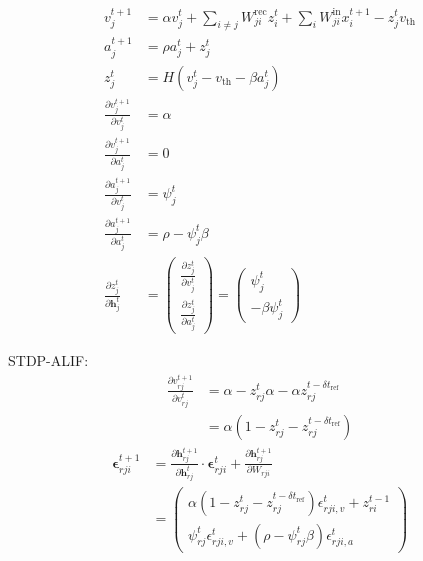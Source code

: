 \documentclass[t]{beamer}
\begin{document}
\begin{frame}
\begin{align}
v^{t+1}_j &= \alpha v_j^t + \sum_{i\neq j}W^\text{rec}_{ji}z_i^t + \sum_i W^\text{in}_{ji}x_i^{t+1} - z_j^tv_
            \text{th}\\
a^{t+1}_j &= \rho a^t_j + z^t_j\\
z^t_j &= H\left(v_j^t - v_\text{th} - \beta a^t_j\right)\\
\frac{\partial v_j^{t+1}}{\partial v_j^t} &= \alpha\\
\frac{\partial v_j^{t+1}}{\partial a_j^t} &= 0\\
\frac{\partial a_j^{t+1}}{\partial v_j^t} &= \psi^t_j\\
\frac{\partial a_j^{t+1}}{\partial a_j^t} &= \rho - \psi^t_j\beta\\
\frac{\partial z^t_j}{\partial\mathbf{h}^t_j} &= \begin{pmatrix}
                    \frac{\partial z^t_j}{\partial v^t_j}\\
                    \frac{\partial z^t_j}{\partial a^t_j}
                    \end{pmatrix}
                = \begin{pmatrix}
                    \psi^t_j\\
                    -\beta\psi^t_j
                    \end{pmatrix}
\end{align}
\end{frame}

\begin{frame}
STDP-ALIF:
\begin{align}
          \frac{\partial v_{rj}^{t+1}}{\partial v^t_{rj}} &= \alpha - z^t_{rj}\alpha - \alpha z_{rj}^{t-\delta t_\text{ref}}\\
          &= \alpha\left(1 - z^t_{rj} - z_{rj}^{t-\delta t_\text{ref}}\right)
          \end{align}
\begin{align}
          \bm{\epsilon}^{t+1}_{rji} &= \frac{\partial\mathbf{h}^{t+1}_{rj}}{\partial\mathbf{h}^t_{rj}}\cdot\bm{\epsilon}^t_{rji} + \frac{\partial\mathbf{h}^{t+1}_{rj}}{\partial W_{rji}}\\
          &= \begin{pmatrix}
          \alpha\left(1 - z^t_{rj} - z_{rj}^{t-\delta t_\text{ref}}\right)\epsilon_{rji, v}^t + z_{ri}^{t-1}\\
          \psi^t_{rj}\epsilon^t_{rji, v} + \left(\rho - \psi^t_{rj}\beta\right)\epsilon^t_{rji,a}
          \end{pmatrix}\label{eq:ml_stdpalif_evector}
          \end{align}


\end{frame}
\end{document}
